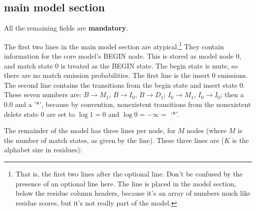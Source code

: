 \subsection{main model section}

All the remaining fields are \textbf{mandatory}.

The first two lines in the main model section are
atypical.\footnote{That is, the first two lines after the optional
   line. Don't be confused by the presence of an optional 
  line here. The  line is placed in the model section, below the
  residue column headers, because it's an array of numbers much like
  residue scores, but it's not really part of the model.}  They
contain information for the core model's BEGIN node. This is stored as
model node 0, and match state 0 is treated as the BEGIN state.  The
begin state is mute, so there are no match emission probabilities. The
first line is the insert 0 emissions. The second line contains the
transitions from the begin state and insert state 0.  These seven
numbers are: $B \rightarrow M_1$, $B \rightarrow I_0$, $B \rightarrow
D_1$; $I_0 \rightarrow M_1$, $I_0 \rightarrow I_0$; then a 0.0 and a
'*', because by convention, nonexistent transitions from the
nonexistent delete state 0 are set to $\log 1 = 0$ and $\log 0 =
-\infty = $ `*'.

The remainder of the model has three lines per node, for $M$ nodes
(where $M$ is the number of match states, as given by the 
line). These three lines are ($K$ is the alphabet size in residues):

